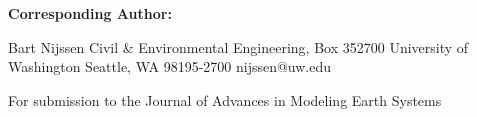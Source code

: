 \textbf{Corresponding Author: }

Bart Nijssen
Civil & Environmental Engineering, Box 352700
University of Washington
Seattle, WA 98195-2700
nijssen@uw.edu

For submission to the Journal of Advances in Modeling Earth Systems
  
  